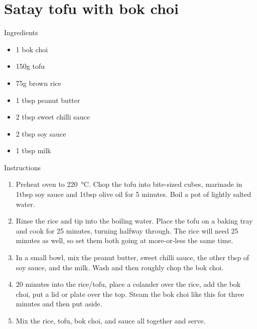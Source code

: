 \documentclass[../dinner.tex]{subfiles}
\begin{document}
	\pagestyle{fancy}
	\fancyhf{}
	\newpage
	\section{Satay tofu with bok choi}
	\lhead{}
	{\Large Ingredients}
	\begin{multicols}{2}
		\begin{itemize}
			\item 1 bok choi
			\item 150g tofu
			\item 75g brown rice
		\end{itemize}
		\columnbreak
		\begin{itemize}
			\item 1 tbsp peanut butter
			\item 2 tbsp sweet chilli sauce
			\item 2 tbsp soy sauce
			\item 1 tbsp milk
		\end{itemize}
	\end{multicols}

	{\Large Instructions}
	\begin{enumerate}
		\item Preheat oven to \SI{220}{\celsius}. Chop the tofu into bite-sized cubes, marinade in 1tbsp soy sauce and 1tbsp olive oil for 5 minutes. Boil a pot of lightly salted water.
		\item Rinse the rice and tip into the boiling water. Place the tofu on a baking tray and cook for 25 minutes, turning halfway through. The rice will need 25 minutes as well, so set them both going at more-or-less the same time.
		\item In a small bowl, mix the peanut butter, sweet chilli sauce, the other tbsp of soy sauce, and the milk. Wash and then roughly chop the bok choi.
		\item 20 minutes into the rice/tofu, place a colander over the rice, add the bok choi, put a lid or plate over the top. Steam the bok choi like this for three minutes and then put aside.
		\item Mix the rice, tofu, bok choi, and sauce all together and serve.
	\end{enumerate}
\end{document}
